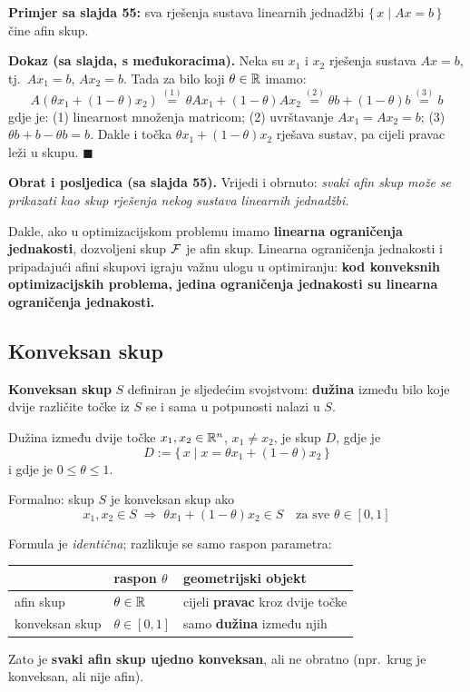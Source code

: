 \textbf{Primjer sa slajda 55:} sva rješenja sustava linearnih jednadžbi
$\{\, x \mid Ax = b \,\}$ čine afin skup.

\textbf{Dokaz (sa slajda, s međukoracima).} Neka su $x_1$ i $x_2$ rješenja
sustava $Ax = b$, tj.\ $Ax_1 = b$, $Ax_2 = b$. Tada za bilo koji
$\theta \in \mathbb{R}$ imamo:
\[
A(\theta x_1 + (1-\theta)x_2)
\overset{(1)}{=} \theta Ax_1 + (1-\theta)Ax_2
\overset{(2)}{=} \theta b + (1-\theta)b
\overset{(3)}{=} b
\]
gdje je: (1) linearnost množenja matricom; (2) uvrštavanje
$Ax_1 = Ax_2 = b$; (3) $\theta b + b - \theta b = b$. Dakle i točka
$\theta x_1 + (1-\theta)x_2$ rješava sustav, pa cijeli pravac leži u skupu.
$\blacksquare$

\textbf{Obrat i posljedica (sa slajda 55).} Vrijedi i obrnuto: \emph{svaki afin
skup može se prikazati kao skup rješenja nekog sustava linearnih jednadžbi.}

Dakle, ako u optimizacijskom problemu imamo \textbf{linearna ograničenja
jednakosti}, dozvoljeni skup $\mathcal{F}$ je afin skup. Linearna ograničenja
jednakosti i pripadajući afini skupovi igraju važnu ulogu u optimiranju:
\textbf{kod konveksnih optimizacijskih problema, jedina ograničenja jednakosti
su linearna ograničenja jednakosti.}

\subsection{Konveksan skup}

\begin{definicija}
\textbf{Konveksan skup} $S$ definiran je sljedećim svojstvom: \textbf{dužina}
između bilo koje dvije različite točke iz $S$ se i sama u potpunosti nalazi u
$S$.

Dužina između dvije točke $x_1, x_2 \in \mathbb{R}^n$, $x_1 \ne x_2$, je skup $D$, gdje
je
\[
D := \{\, x \mid x = \theta x_1 + (1-\theta)x_2 \,\}
\]
i gdje je $0 \le \theta \le 1$.

Formalno: skup $S$ je konveksan skup ako
\[
x_1, x_2 \in S \;\Longrightarrow\; \theta x_1 + (1-\theta)x_2 \in S
\quad\text{za sve } \theta \in [0,1]
\]
\end{definicija}

\begin{napomena}
Formula je \emph{identična}; razlikuje se samo raspon parametra:
\begin{center}
\begin{tabular}{lll}
\toprule
& \textbf{raspon} $\theta$ & \textbf{geometrijski objekt} \\
\midrule
afin skup & $\theta \in \mathbb{R}$ & cijeli \textbf{pravac} kroz dvije točke \\
konveksan skup & $\theta \in [0,1]$ & samo \textbf{dužina} između njih \\
\bottomrule
\end{tabular}
\end{center}
Zato je \textbf{svaki afin skup ujedno konveksan}, ali ne obratno (npr.\ krug
je konveksan, ali nije afin).
\end{napomena}


